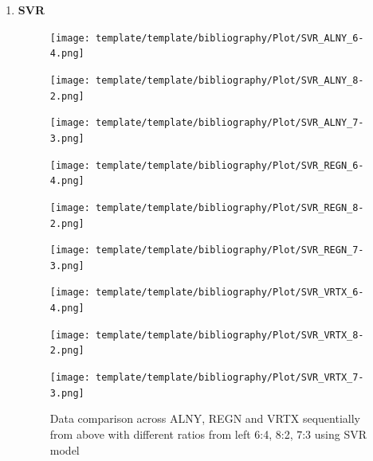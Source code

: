 \documentclass{ieeeojies}
\begin{document}
\begin{enumerate}
  \item \textbf{SVR} 
\begin{figure}[H]
    \centering
    \begin{minipage}{0.155\textwidth}
    \centering
    \texttt{[image: template/template/bibliography/Plot/SVR\_ALNY\_6-4.png]}
    \end{minipage}
    \hfill
    \begin{minipage}{0.155\textwidth}
    \centering
    \texttt{[image: template/template/bibliography/Plot/SVR\_ALNY\_8-2.png]}
    \end{minipage}
    \hfill
    \begin{minipage}{0.155\textwidth}
    \centering
    \texttt{[image: template/template/bibliography/Plot/SVR\_ALNY\_7-3.png]}
    \end{minipage}
    \hfill
    \begin{minipage}{0.155\textwidth}
    \centering
    \texttt{[image: template/template/bibliography/Plot/SVR\_REGN\_6-4.png]}
    \end{minipage}
    \hfill
    \begin{minipage}{0.155\textwidth}
    \centering
    \texttt{[image: template/template/bibliography/Plot/SVR\_REGN\_8-2.png]}
    \end{minipage}
    \hfill
    \begin{minipage}{0.155\textwidth}
    \centering
    \texttt{[image: template/template/bibliography/Plot/SVR\_REGN\_7-3.png]}
    \end{minipage}
    \hfill
    \begin{minipage}{0.155\textwidth}
    \centering
    \texttt{[image: template/template/bibliography/Plot/SVR\_VRTX\_6-4.png]}
    \end{minipage}
    \hfill
    \begin{minipage}{0.155\textwidth}
    \centering
    \texttt{[image: template/template/bibliography/Plot/SVR\_VRTX\_8-2.png]}
    \end{minipage}
    \hfill
    \begin{minipage}{0.155\textwidth}
    \centering
    \texttt{[image: template/template/bibliography/Plot/SVR\_VRTX\_7-3.png]}
    \end{minipage}
\caption{Data comparison across ALNY, REGN and VRTX sequentially from above with different ratios from left 6:4, 8:2, 7:3 using SVR model}
\label{fig:combined}
\end{figure}


\end{enumerate}
\end{document}
